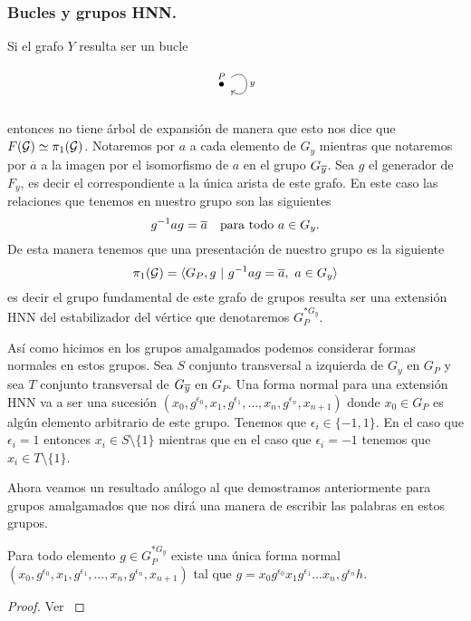 \documentclass[tesis.tex]{subfiles}
\begin{document}
\subsubsection{Bucles y grupos HNN.}

Si el grafo $Y$ resulta ser un bucle
\[
	\begin{tikzcd}
		\overset{P}{\bullet} \arrow["y", loop, distance=2em, in=325, out=35]
	\end{tikzcd}
\]

entonces no tiene árbol de expansión de manera que esto nos dice que $F({\cal G}) \simeq \pi_1({\cal G})$.
Notaremos por $a$ a cada elemento de $G_y$ mientras que notaremos por $\overline{a}$ a la imagen por el isomorfismo de $a$ en el grupo $G_{\overline y}$.
Sea $g$ el generador de $F_{y}$, es decir el correspondiente a la única arista de este grafo. 
En este caso las relaciones que tenemos en nuestro grupo son las siguientes
\[
	g^{-1}ag = \overline{a}  \  \ \ \text{para todo} \ a \in G_y.
\]   
De esta manera tenemos que una presentación de nuestro grupo es la siguiente
\[
	\pi_1({\cal G}) = \langle G_P, g \ | \ g^{-1}ag = \overline{a}, \ a \in G_y \rangle
\]
es decir el grupo fundamental de este grafo de grupos resulta ser una extensión HNN del estabilizador del vértice que denotaremos $G_P^{\ast G_y}$.

Así como hicimos en los grupos amalgamados podemos considerar formas normales en estos grupos.
Sea $S$ conjunto transversal a izquierda de $G_y$ en $G_P$ y sea $T$ conjunto transversal de $G_{\overline y}$ en $G_P$.
Una forma normal para una extensión HNN va a ser una sucesión $(x_{0},g^{\epsilon_0},x_{1},g^{\epsilon_1}, \dots, x_{n},g^{\epsilon_n},x_{n+1})$ donde $x_0 \in G_P$ es algún elemento arbitrario de este grupo.
Tenemos que $\epsilon_{i} \in \{ -1,1 \}$.
En el caso que $\epsilon_{i} = 1$ entonces $x_i \in S \setminus \{ 1\}$ mientras que en el caso que $\epsilon_{i} = -1$ tenemos que $x_{i} \in T \setminus \{ 1 \}$. 


Ahora veamos un resultado análogo al que demostramos anteriormente para grupos amalgamados que nos dirá una manera de escribir las palabras en estos grupos.

\begin{prop}\label{prop_hnn_formanormal}
	Para todo elemento $g \in G_P^{\ast G_y}$ existe una única forma normal $(x_{0},g^{\epsilon_0},x_{1},g^{\epsilon_1}, \dots, x_{n},g^{\epsilon_n},x_{n+1})$ tal que $g = x_{0}g^{\epsilon_0}x_{1}g^{\epsilon_1} \dots x_{n},g^{\epsilon_n}h$.
\end{prop}
\begin{proof}
	Ver \cite{lyndon1977combinatorial}
\end{proof}
\end{document}
